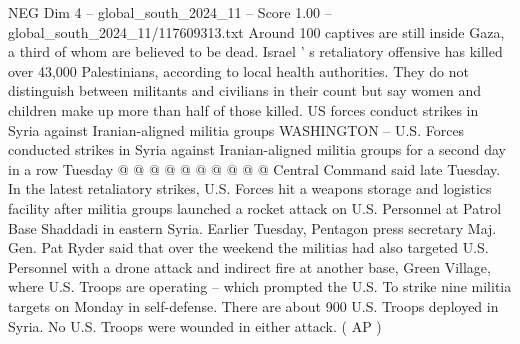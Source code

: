 \begin{textsample}{NEG Dim 4 – global\_south\_2024\_11 – Score 1.00 – global\_south\_2024\_11/117609313.txt}
Around 100 captives are still inside Gaza, a third of whom are believed to be dead.
Israel ' s retaliatory offensive has killed over 43,000 Palestinians, according to local health authorities.
They do not distinguish between militants and civilians in their count but say women and children make up more than half of those killed.
US forces conduct strikes in Syria against Iranian-aligned militia groups WASHINGTON -- U.S.
Forces conducted strikes in Syria against Iranian-aligned militia groups for a second day in a row Tuesday @ @ @ @ @ @ @ @ @ @ Central Command said late Tuesday.
In the latest retaliatory strikes, U.S.
Forces hit a weapons storage and logistics facility after militia groups launched a rocket attack on U.S.
Personnel at Patrol Base Shaddadi in eastern Syria.
Earlier Tuesday, Pentagon press secretary Maj.
Gen.
Pat Ryder said that over the weekend the militias had also targeted U.S.
Personnel with a drone attack and indirect fire at another base, Green Village, where U.S.
Troops are operating -- which prompted the U.S.
To strike nine militia targets on Monday in self-defense.
There are about 900 U.S.
Troops deployed in Syria.
No U.S.
Troops were wounded in either attack. ( AP )

\end{textsample}
